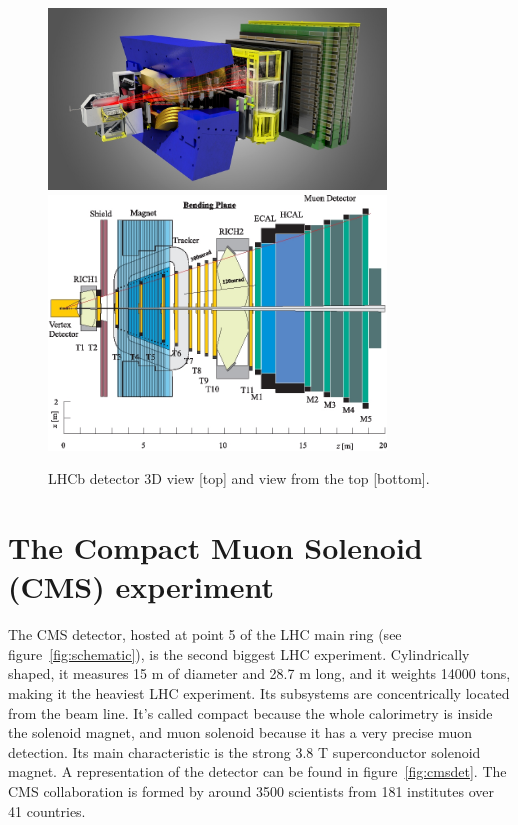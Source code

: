 \begin{figure}[!Hhtbp]
  \begin{center}
    \includegraphics[width=0.8\textwidth]{figs/LHCbDetectorlight1.jpg}
    \includegraphics[width=0.8\textwidth]{figs/LHCb_UpView.jpg}
    \caption{LHCb detector 3D view [top] and view from the top [bottom]. }
    \label{fig:lhcbdet}
  \end{center}
\end{figure}


\section{The Compact Muon Solenoid (CMS) experiment}
\label{sec:CMS}

The CMS detector, hosted at point 5 of the LHC main ring (see figure~\ref{fig:schematic}), is the second biggest LHC experiment. Cylindrically shaped, it measures 15 m of diameter and 28.7 m long, and it weights 14000 tons, making it the heaviest LHC experiment. Its subsystems are concentrically located from the beam line. It's called compact because the whole calorimetry is inside the solenoid magnet, and muon solenoid because it has a very precise muon detection. Its main characteristic is the strong 3.8 T superconductor solenoid magnet. A representation of the detector can be found in figure~\ref{fig:cmsdet}. The CMS collaboration is formed by around 3500 scientists from 181 institutes over 41 countries. 

